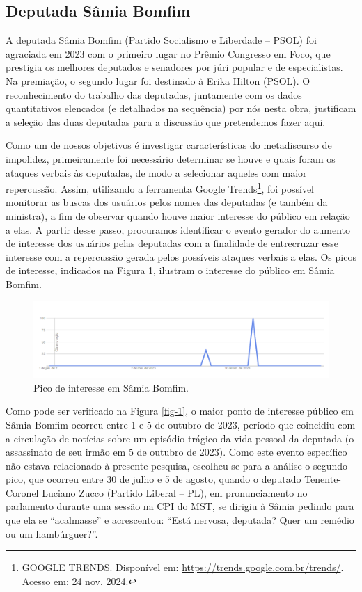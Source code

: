 \documentclass[portuguese]{textolivre}
\begin{document}
\subsection{Deputada Sâmia Bomfim}\label{sec-3.1}
A deputada Sâmia Bomfim (Partido Socialismo e Liberdade -- PSOL) foi agraciada em 2023 com o primeiro lugar no Prêmio Congresso em Foco, que prestigia os melhores deputados e senadores por júri popular e de especialistas. Na premiação, o segundo lugar foi destinado à Erika Hilton (PSOL). O reconhecimento do trabalho das deputadas, juntamente com os dados quantitativos elencados (e detalhados na sequência) por nós nesta obra, justificam a seleção das duas deputadas para a discussão que pretendemos fazer aqui.

Como um de nossos objetivos é investigar características do metadiscurso de impolidez, primeiramente foi necessário determinar se houve e quais foram os ataques verbais às deputadas, de modo a selecionar aqueles com maior repercussão. Assim, utilizando a ferramenta Google Trends\footnote{GOOGLE TRENDS. Disponível em: \url{https://trends.google.com.br/trends/}. Acesso em: 24 nov. 2024.}, foi possível monitorar as buscas dos usuários pelos nomes das deputadas (e também da ministra), a fim de observar quando houve maior interesse do público em relação a elas. A partir desse passo, procuramos identificar o evento gerador do aumento de interesse dos usuários pelas deputadas com a finalidade de entrecruzar esse interesse com a repercussão gerada pelos possíveis ataques verbais a elas. Os picos de interesse, indicados na Figura \ref{graf-1}, ilustram o interesse do público em Sâmia Bomfim.

\begin{figure}[h!]
\centering
\begin{minipage}{.95\textwidth}
\includegraphics[width =\textwidth ]{Fig1.png}
\caption{Pico de interesse em Sâmia Bomfim.}
\label{graf-1}
\end{minipage}
\end{figure}

Como pode ser verificado na Figura \ref{fig-1}, o maior ponto de interesse público em Sâmia Bomfim ocorreu entre 1 e 5 de outubro de 2023, período que coincidiu com a circulação de notícias sobre um episódio trágico da vida pessoal da deputada (o assassinato de seu irmão em 5 de outubro de 2023). Como este evento específico não estava relacionado à presente pesquisa, escolheu-se para a análise o segundo pico, que ocorreu entre 30 de julho e 5 de agosto, quando o deputado Tenente-Coronel Luciano Zucco (Partido Liberal – PL), em pronunciamento no parlamento durante uma sessão na CPI do MST, se dirigiu à Sâmia pedindo para que ela se ``acalmasse'' e acrescentou: ``Está nervosa, deputada? Quer um remédio ou um hambúrguer?''.
\end{document}
